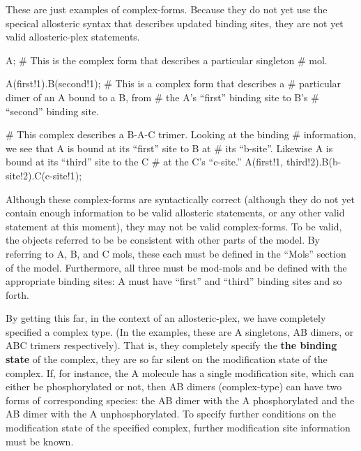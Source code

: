 These are just examples of complex-forms.  Because they do not yet use
the specical allosteric syntax that describes updated binding sites,
they are not yet valid allosteric-plex statements.

\begin{ExampleMZR}

A;  # This is the complex form that describes a particular singleton
    # mol.

A(first!1).B(second!1); # This is a complex form that describes a
                        # particular dimer of an A bound to a B, from
                        # the A's ``first'' binding site to B's
                        # ``second'' binding site.

# This complex describes a B-A-C trimer.  Looking at the binding
# information, we see that A is bound at its ``first'' site to B at 
# its ``b-site''.  Likewise A is bound at its ``third'' site to the C 
# at the C's ``c-site.''
A(first!1, third!2).B(b-site!2).C(c-site!1);

\end{ExampleMZR}


Although these complex-forms are syntactically correct (although they
do not yet contain enough information to be valid allosteric
statements, or any other valid statement at this moment), they may not
be valid complex-forms.  To be valid, the objects referred to be be
consistent with other parts of the model.  By referring to A, B, and C
mols, these each must be defined in the ``Mols'' section of the
model.  Furthermore, all three must be mod-mols and be defined with
the appropriate binding sites: A must have ``first'' and ``third''
binding sites and so forth.  

By getting this far, in the context of an allosteric-plex, we have
completely specified a complex type.  (In the examples, these are A
singletons, AB dimers, or ABC trimers respectively).  That is, they
completely specify the {\bf the binding state} of the complex, they
are so far silent on the modification state of the complex.  If, for
instance, the A molecule has a single modification site, which can
either be phosphorylated or not, then AB dimers (complex-type) can
have two forms of corresponding species: the AB dimer with the A
phosphorylated and the AB dimer with the A unphosphorylated.  To
specify further conditions on the modification state of the specified
complex, further modification site information must be known.  

